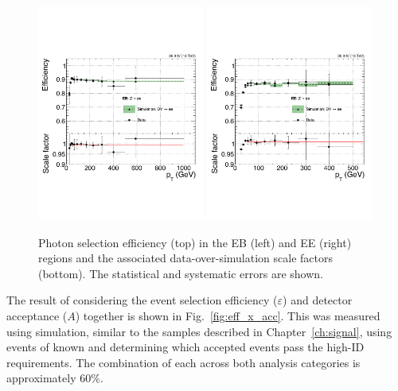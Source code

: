 \begin{figure}[!htbp]
	\centering
  	\includegraphics[angle=0,width=0.49\textwidth]{figures/sf_vs_pt_EB2.pdf}
	\includegraphics[angle=0,width=0.49\textwidth]{figures/sf_vs_pt_EE2.pdf}
	\caption{Photon selection efficiency (top) in the EB (left) and EE (right) regions and the associated data-over-simulation scale factors (bottom). The statistical and systematic errors are shown.}
	\label{fig:tnp_eff}
\end{figure}

The result of considering the event selection efficiency ($\varepsilon$) and detector acceptance ($A$) together is shown in Fig.~\ref{fig:eff_x_acc}. This was measured using simulation, similar to the samples described in Chapter~\ref{ch:signal}, using events of known \mgg and determining which accepted events pass the high-\pt ID requirements. The combination of each across both analysis categories is approximately 60\%.

